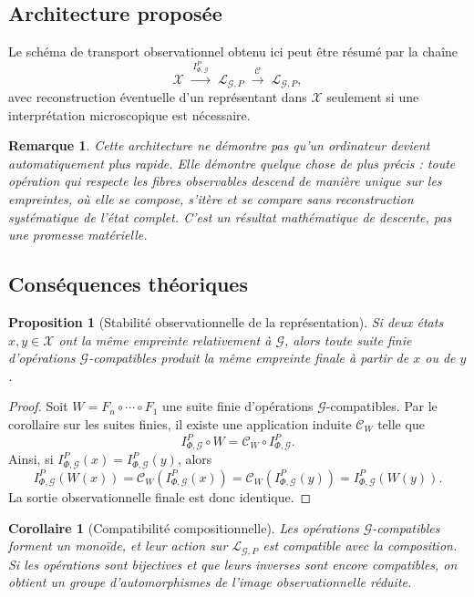 \documentclass[11pt,a4paper,openany]{book}
\newtheorem{proposition}[definition]{Proposition}
\newtheorem{corollary}[definition]{Corollaire}
\newtheorem{remark}[definition]{Remarque}
\begin{document}
\subsection{Architecture proposée}

Le schéma de transport observationnel obtenu ici peut être résumé par la chaîne
\[
\mathcal X
\;\xrightarrow{\ I_{\Phi,\mathcal G}^P\ }\;
\mathcal L_{\mathcal G,P}
\;\xrightarrow{\ \mathcal C\ }\;
\mathcal L_{\mathcal G,P},
\]
avec reconstruction éventuelle d'un représentant dans \(\mathcal X\) seulement si une interprétation microscopique est nécessaire.

\begin{remark}
Cette architecture ne démontre pas qu'un ordinateur devient automatiquement plus rapide. Elle démontre quelque chose de plus précis : toute opération qui respecte les fibres observables descend de manière unique sur les empreintes, où elle se compose, s'itère et se compare sans reconstruction systématique de l'état complet. C'est un résultat mathématique de descente, pas une promesse matérielle.
\end{remark}

\subsection{Conséquences théoriques}

\begin{proposition}[Stabilité observationnelle de la représentation]
Si deux états \(x,y\in\mathcal X\) ont la même empreinte relativement à \(\mathcal G\), alors toute suite finie d'opérations \(\mathcal G\)-compatibles produit la même empreinte finale à partir de \(x\) ou de \(y\).
\end{proposition}

\begin{proof}
Soit \(W=F_n\circ\cdots\circ F_1\) une suite finie d'opérations \(\mathcal G\)-compatibles. Par le corollaire sur les suites finies, il existe une application induite \(\mathcal C_W\) telle que
\[
I_{\Phi,\mathcal G}^P\circ W=\mathcal C_W\circ I_{\Phi,\mathcal G}^P.
\]
Ainsi, si \(I_{\Phi,\mathcal G}^P(x)=I_{\Phi,\mathcal G}^P(y)\), alors
\[
I_{\Phi,\mathcal G}^P(W(x))
=
\mathcal C_W(I_{\Phi,\mathcal G}^P(x))
=
\mathcal C_W(I_{\Phi,\mathcal G}^P(y))
=
I_{\Phi,\mathcal G}^P(W(y)).
\]
La sortie observationnelle finale est donc identique.
\end{proof}

\begin{corollary}[Compatibilité compositionnelle]
Les opérations \(\mathcal G\)-compatibles forment un monoïde, et leur action sur \(\mathcal L_{\mathcal G,P}\) est compatible avec la composition. Si les opérations sont bijectives et que leurs inverses sont encore compatibles, on obtient un groupe d'automorphismes de l'image observationnelle réduite.
\end{corollary}
\end{document}
